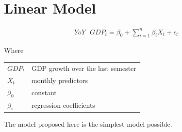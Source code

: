 \documentclass[12pt,a4paper,oneside]{book}
\begin{document}
\section{Linear Model}

\begin{eqnarray}
    YoY \text{ } GDP_{t} = \beta_0 + \sum^n_{i = 1}
       \beta_{i} X_{t} + \epsilon_t 
\end{eqnarray}

Where 

\begin{tabular}{l l}
    $GDP_t$         & GDP growth over the last semester \\
    $X_{t}$         & monthly predictors \\
    $\beta_{0}$     & constant \\
    $\beta_{i}$     & regression coefficients \\
\end{tabular}

The model proposed here is the simplest model possible.
\end{document}
